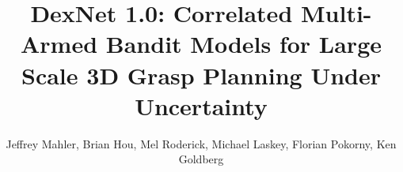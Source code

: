 \documentclass[letterpaper, 10 pt, conference]{ieeeconf}  %
\begin{document}
\title{\LARGE \bf DexNet 1.0: Correlated Multi-Armed Bandit Models for Large Scale 3D Grasp Planning Under Uncertainty}
\author{Jeffrey Mahler, Brian Hou, Mel Roderick, Michael Laskey, Florian Pokorny, Ken Goldberg}
\maketitle

%
%

%
%
%
%
%
%
%
%

%

\addtolength{\textheight}{-9.0cm}



\end{document}
